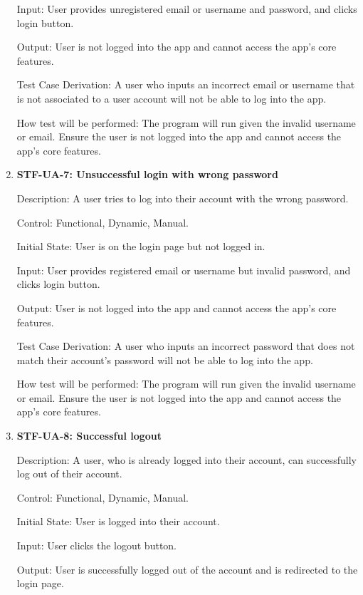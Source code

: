 \documentclass[12pt, titlepage]{article}
\begin{document}
\begin{enumerate}
        Input: User provides unregistered email or username and password, and clicks login button.

        Output: User is not logged into the app and cannot access the app’s core features.

        Test Case Derivation: A user who inputs an incorrect email or username that is not associated to a user account will not be able to log into the app.

        How test will be performed: The program will run given the invalid username or email. Ensure the user is not logged into the app and cannot access the app’s core features.

        \item{\textbf{STF-UA-7: Unsuccessful login with wrong password}\\}

        Description: A user tries to log into their account with the wrong password.

        Control:  Functional, Dynamic, Manual.

        Initial State: User is on the login page but not logged in.

        Input: User provides registered email or username but invalid password, and clicks login button.

        Output: User is not logged into the app and cannot access the app’s core features.

        Test Case Derivation: A user who inputs an incorrect password that does not match their account’s password will not be able to log into the app.

        How test will be performed: The program will run given the invalid username or email. Ensure the user is not logged into the app and cannot access the app’s core features.

        \item{\textbf{STF-UA-8: Successful logout}\\}

        Description: A user, who is already logged into their account, can successfully log out of their account.

        Control: Functional, Dynamic, Manual.

        Initial State: User is logged into their account.

        Input: User clicks the logout button.

        Output: User is successfully logged out of the account and is redirected to the login page.


\end{enumerate}
\end{document}
